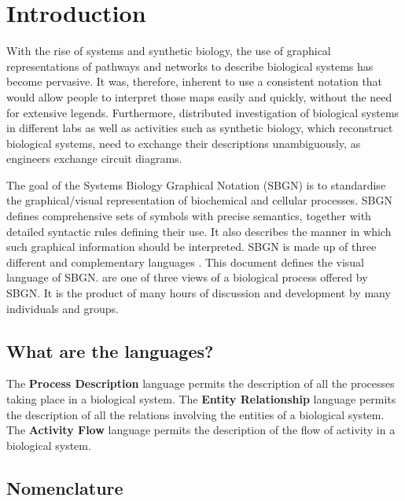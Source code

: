 

\chapter{Introduction}

With the rise of systems and synthetic biology, the use of graphical representations
of pathways and networks to describe biological systems has become pervasive. 
It was, therefore, inherent to use a consistent notation that would allow people 
to interpret those maps easily and quickly, without the need for extensive legends.
Furthermore, distributed investigation of biological systems in different labs as well
as activities such as synthetic biology, which reconstruct biological systems, need
to exchange their descriptions unambiguously, as engineers exchange circuit diagrams.

The goal of the Systems Biology Graphical Notation (SBGN) is to standardise the 
graphical/visual representation of biochemical and cellular processes. SBGN 
defines comprehensive sets of symbols with precise semantics, together with 
detailed syntactic rules defining their use. It also describes the manner 
in which such graphical information should be interpreted.
SBGN is made up of three different and complementary languages \cite{Novere:2009p1}.
This document defines the \emph{\PD{}} visual language of SBGN. \PDs are 
one of three views of a biological process offered by SBGN. It is the 
product of many hours of discussion and development by many individuals and 
groups.


\section{What are the languages?}
\label{sec:what-languages}

The \textbf{Process Description} language permits the description of all the processes taking place in a biological system. 
The \textbf{Entity Relationship} language permits the description of all the relations involving the entities of a biological system.
The \textbf{Activity Flow} language permits the description of the flow of activity in a biological system.

\section{Nomenclature}
\label{sec:nomenclature}

